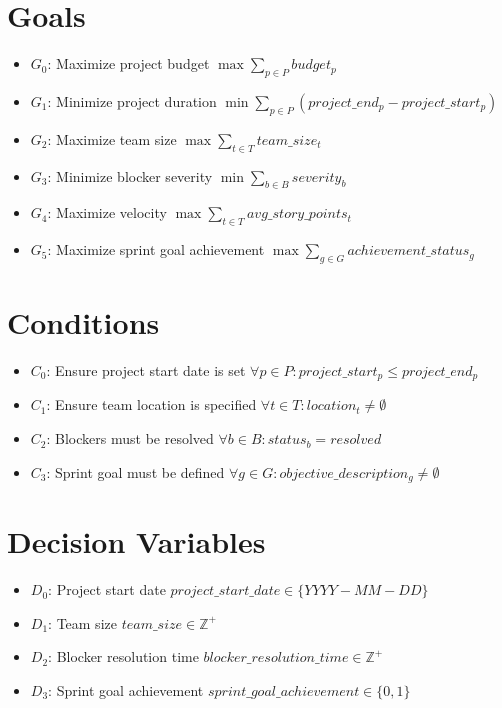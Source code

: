 \documentclass{article}
\begin{document}
\section{Goals}
\begin{itemize}
    \item $G_0$: Maximize project budget $\max \sum_{p \in P} budget_p$
    \item $G_1$: Minimize project duration $\min \sum_{p \in P} (project\_end_p - project\_start_p)$
    \item $G_2$: Maximize team size $\max \sum_{t \in T} team\_size_t$
    \item $G_3$: Minimize blocker severity $\min \sum_{b \in B} severity_b$
    \item $G_4$: Maximize velocity $\max \sum_{t \in T} avg\_story\_points_t$
    \item $G_5$: Maximize sprint goal achievement $\max \sum_{g \in G} achievement\_status_g$
\end{itemize}

\section{Conditions}
\begin{itemize}
    \item $C_0$: Ensure project start date is set $\forall p \in P: project\_start_p \leq project\_end_p$
    \item $C_1$: Ensure team location is specified $\forall t \in T: location_t \neq \emptyset$
    \item $C_2$: Blockers must be resolved $\forall b \in B: status_b = resolved$
    \item $C_3$: Sprint goal must be defined $\forall g \in G: objective\_description_g \neq \emptyset$
\end{itemize}

\section{Decision Variables}
\begin{itemize}
    \item $D_0$: Project start date $project\_start\_date \in \{YYYY-MM-DD\}$
    \item $D_1$: Team size $team\_size \in \mathbb{Z}^+$
    \item $D_2$: Blocker resolution time $blocker\_resolution\_time \in \mathbb{Z}^+$
    \item $D_3$: Sprint goal achievement $sprint\_goal\_achievement \in \{0,1\}$
\end{itemize}
\end{document}
